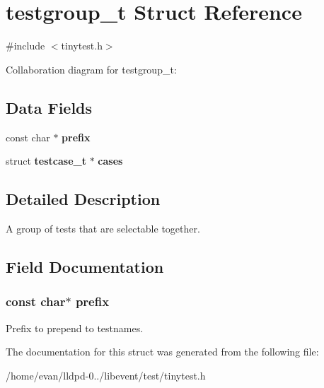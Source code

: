 \section{testgroup\-\_\-t \-Struct \-Reference}
\label{structtestgroup__t}


{\ttfamily \#include $<$tinytest.\-h$>$}



\-Collaboration diagram for testgroup\-\_\-t\-:
\subsection*{\-Data \-Fields}
\begin{DoxyCompactItemize}
\item 
const char $\ast$ {\bf prefix}
\item 
struct {\bf testcase\-\_\-t} $\ast$ {\bfseries cases}\label{structtestgroup__t_a93f715d1b9c65fff8a218092673c6e78}

\end{DoxyCompactItemize}


\subsection{\-Detailed \-Description}
\-A group of tests that are selectable together. 

\subsection{\-Field \-Documentation}
\subsubsection[{prefix}]{\setlength{\rightskip}{0pt plus 5cm}const char$\ast$ {\bf prefix}}\label{structtestgroup__t_a5b41c5ae4505891e6c53e26df197e02b}
\-Prefix to prepend to testnames. 

\-The documentation for this struct was generated from the following file\-:\begin{DoxyCompactItemize}
\item 
/home/evan/lldpd-\/0../libevent/test/tinytest.\-h\end{DoxyCompactItemize}

